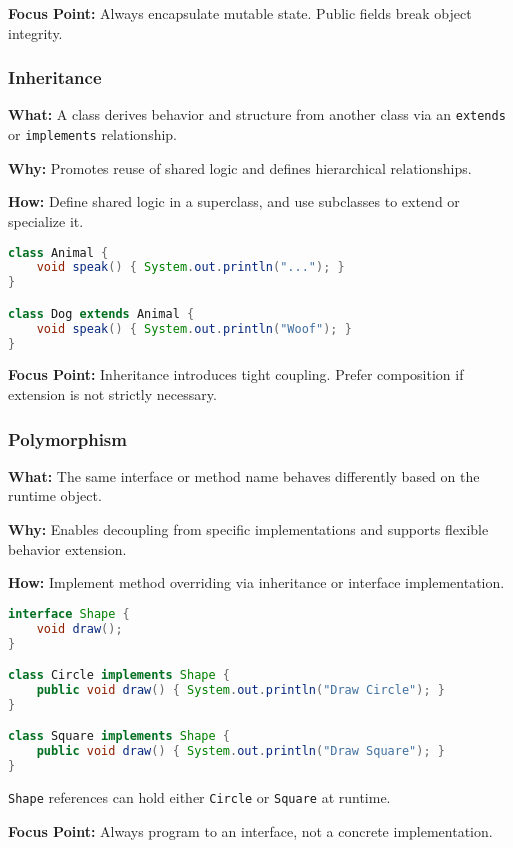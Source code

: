\documentclass[a4paper,12pt]{article}
\begin{document}
\textbf{Focus Point:} Always encapsulate mutable state. Public fields break object integrity.

\subsubsection{Inheritance}

\textbf{What:} A class derives behavior and structure from another class via an \texttt{extends} or \texttt{implements} relationship.

\textbf{Why:} Promotes reuse of shared logic and defines hierarchical relationships.

\textbf{How:} Define shared logic in a superclass, and use subclasses to extend or specialize it.

\begin{lstlisting}[language=Java]
class Animal {
    void speak() { System.out.println("..."); }
}

class Dog extends Animal {
    void speak() { System.out.println("Woof"); }
}
\end{lstlisting}

\textbf{Focus Point:} Inheritance introduces tight coupling. Prefer composition if extension is not strictly necessary.

\subsubsection{Polymorphism}

\textbf{What:} The same interface or method name behaves differently based on the runtime object.

\textbf{Why:} Enables decoupling from specific implementations and supports flexible behavior extension.

\textbf{How:} Implement method overriding via inheritance or interface implementation.

\begin{lstlisting}[language=Java]
interface Shape {
    void draw();
}

class Circle implements Shape {
    public void draw() { System.out.println("Draw Circle"); }
}

class Square implements Shape {
    public void draw() { System.out.println("Draw Square"); }
}
\end{lstlisting}

\texttt{Shape} references can hold either \texttt{Circle} or \texttt{Square} at runtime.

\textbf{Focus Point:} Always program to an interface, not a concrete implementation.
\end{document}
